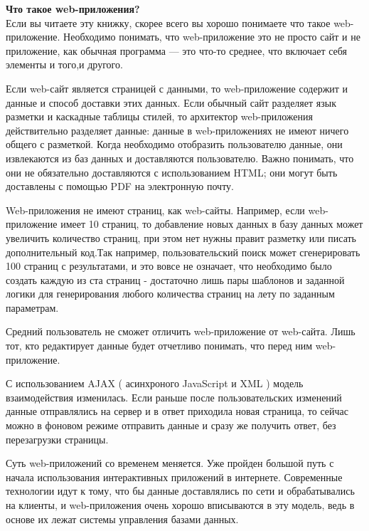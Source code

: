 %

\textbf{Что такое web-приложения?}\\


Если вы читаете эту книжку, скорее всего вы хорошо понимаете что такое web-приложение. Необходимо понимать, что web-приложение это не просто сайт и не приложение, как обычная программа --- это что-то среднее, что включает себя элементы и того,и другого.

Если web-сайт является страницей с данными, то web-приложение содержит и данные и способ доставки этих данных. Если обычный сайт разделяет язык разметки и каскадные таблицы стилей, то архитектор web-приложения действительно разделяет данные: данные в web-приложениях не имеют ничего общего с разметкой. Когда необходимо отобразить пользователю данные, они извлекаются из баз данных и доставляются пользователю. Важно понимать, что они не обязательно доставляются с использованием HTML;  они могут быть доставлены с помощью PDF на электронную почту.

Web-приложения не имеют страниц, как web-сайты. Например, если web-приложение имеет 10 страниц, то добавление новых данных в базу данных может увеличить количество страниц, при этом нет нужны правит разметку или писать дополнительный код.Так например, пользовательский поиск может сгенерировать 100 страниц с результатами, и это вовсе не означает, что необходимо было создать каждую из ста страниц - достаточно лишь пары шаблонов и заданной логики для генерирования любого количества страниц на лету по заданным параметрам.

Средний пользователь не сможет отличить web-приложение от web-сайта. Лишь тот, кто редактирует данные будет отчетливо понимать, что перед ним web-приложение.

С использованием AJAX ( асинхроного JavaScript и XML ) модель взаимодействия изменилась. Если раньше после пользовательских изменений данные отправлялись на сервер и в ответ приходила новая страница, то сейчас можно в фоновом режиме отправить данные и сразу же получить ответ, без перезагрузки страницы.

Суть web-приложений со временем меняется. Уже пройден большой путь с начала использования интерактивных приложений в интернете. Современные технологии идут к тому, что бы данные доставлялись по сети и обрабатывались на клиенты, и web-приложения очень хорошо вписываются в эту модель, ведь в основе их лежат системы управления базами данных.


